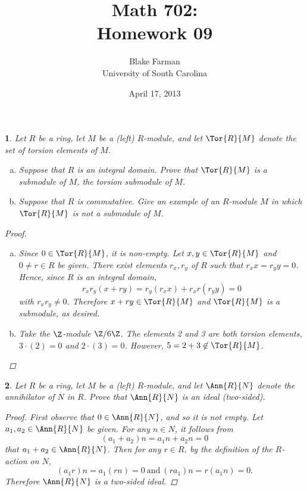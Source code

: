 \documentclass[10pt]{amsart}
\author{Blake Farman\\University of South Carolina}
\title{Math 702:\\Homework 09}
\date{April 17, 2013}
\begin{document}
\maketitle

\providecommand{\p}{\mathfrak{p}}
\providecommand{\m}{\mathfrak{m}}

\newtheorem{thm}{}
\newtheorem{lem}{Lemma}

\begin{thm}
  Let $R$ be a ring, let $M$ be a (left) $R$-module, and let $\Tor{R}{M}$ denote the set of torsion elements of $M$.
  \begin{enumerate}[(a)]
  \item
    Suppose that $R$ is an integral domain.
    Prove that $\Tor{R}{M}$ is a submodule of $M$, the torsion submodule of $M$.
  \item
    Suppose that $R$ is commutative.
    Give an example of an $R$-module $M$ in which $\Tor{R}{M}$ is not a submodule of $M$.
  \end{enumerate}
  
  \begin{proof}
    \begin{enumerate}[(a)]
    \item
      Since $0 \in \Tor{R}{M}$, it is non-empty.
      Let $x,y \in \Tor{R}{M}$ and $0 \neq r \in R$ be given.
      There exist elements $r_x, r_y$ of $R$ such that $r_x x = r_y y = 0$.
      Hence, since $R$ is an integral domain,
      $$r_x r_y(x + ry) = r_y(r_x x) + r_x r(r_y y) = 0$$
      with $r_x r_y \neq 0$.
      Therefore $x + ry \in \Tor{R}{M}$ and $\Tor{R}{M}$ is a submodule, as desired.
    \item
      Take the $\Z$-module $\Z/6\Z$.
      The elements 2 and 3 are both torsion elements, $3 \cdot (2) = 0$ and $2 \cdot (3) = 0$.
      However, $5 = 2 + 3 \not \in \Tor{R}{M}$.
    \end{enumerate}
  \end{proof}
\end{thm}

\begin{thm}
  Let $R$ be a ring, let $M$ be a (left) $R$-module, and let $\Ann{R}{N}$ denote the annihilator of $N$ in $R$.
  Prove that $\Ann{R}{N}$ is an ideal (two-sided).
  
  \begin{proof}
    First observe that $0 \in \Ann{R}{N}$, and so it is not empty.
    Let $a_1, a_2 \in \Ann{R}{N}$ be given.
    For any $n \in N$, it follows from
    $$(a_1 + a_2)n = a_1 n + a_2 n = 0$$
    that $a_1 + a_2 \in \Ann{R}{N}$.
    Then for any $r \in R$, by the definition of the $R$-action on $N$, 
    $$(a_1r)n = a_1(rn) = 0\ \text{and}\ (ra_1)n = r(a_1n) = 0.$$
    Therefore $\Ann{R}{N}$ is a two-sided ideal.
  \end{proof}
\end{thm}
\end{document}
